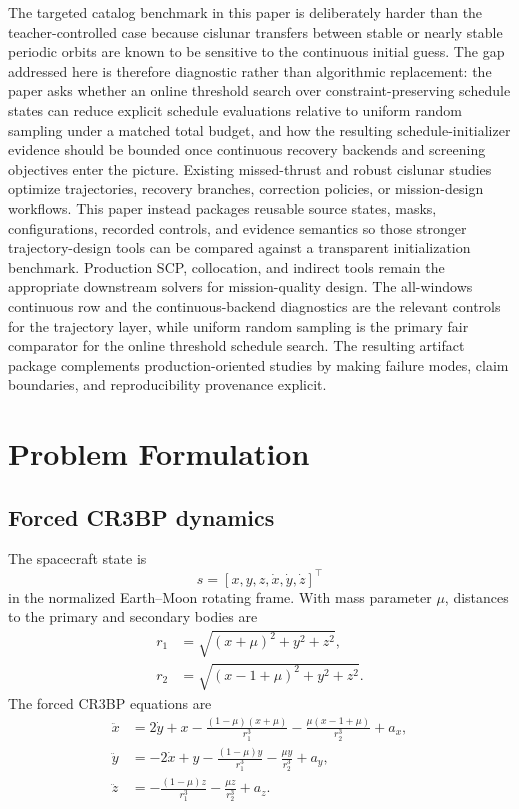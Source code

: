 \documentclass[preprint,12pt]{elsarticle}
\begin{document}
The targeted catalog benchmark in this paper is deliberately harder than the teacher-controlled case because cislunar transfers between stable or nearly stable periodic orbits are known to be sensitive to the continuous initial guess. The gap addressed here is therefore diagnostic rather than algorithmic replacement: the paper asks whether an online threshold search over constraint-preserving schedule states can reduce explicit schedule evaluations relative to uniform random sampling under a matched total budget, and how the resulting schedule-initializer evidence should be bounded once continuous recovery backends and screening objectives enter the picture. Existing missed-thrust and robust cislunar studies optimize trajectories, recovery branches, correction policies, or mission-design workflows. This paper instead packages reusable source states, masks, configurations, recorded controls, and evidence semantics so those stronger trajectory-design tools can be compared against a transparent initialization benchmark. Production SCP, collocation, and indirect tools remain the appropriate downstream solvers for mission-quality design. The all-windows continuous row and the continuous-backend diagnostics are the relevant controls for the trajectory layer, while uniform random sampling is the primary fair comparator for the online threshold schedule search. The resulting artifact package complements production-oriented studies by making failure modes, claim boundaries, and reproducibility provenance explicit.

\section{Problem Formulation}

\subsection{Forced CR3BP dynamics}

The spacecraft state is
\begin{equation}
s = [x,y,z,\dot{x},\dot{y},\dot{z}]^\top
\end{equation}
in the normalized Earth--Moon rotating frame. With mass parameter $\mu$, distances to the primary and secondary bodies are
\begin{align}
r_1 &= \sqrt{(x+\mu)^2+y^2+z^2},\\
r_2 &= \sqrt{(x-1+\mu)^2+y^2+z^2}.
\end{align}
The forced CR3BP equations are
\begin{align}
\ddot{x} &= 2\dot{y}+x-\frac{(1-\mu)(x+\mu)}{r_1^3}-\frac{\mu(x-1+\mu)}{r_2^3}+a_x,\\
\ddot{y} &= -2\dot{x}+y-\frac{(1-\mu)y}{r_1^3}-\frac{\mu y}{r_2^3}+a_y,\\
\ddot{z} &= -\frac{(1-\mu)z}{r_1^3}-\frac{\mu z}{r_2^3}+a_z.
\end{align}
\end{document}
